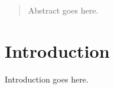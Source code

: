 \documentclass{article}
\begin{document}

\maketitle

\begin{abstract}
Abstract goes here.
\end{abstract}


\section{Introduction}

Introduction goes here.


% 
% 


\vfill
\end{document}
